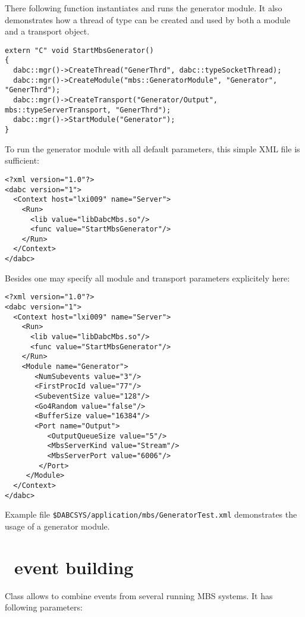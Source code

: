 There following function  instantiates and runs 
the generator module.
It also demonstrates how a thread of type  can be created
and used by both a module and a transport object. 
\begin{small}
\begin{verbatim}
extern "C" void StartMbsGenerator()
{
  dabc::mgr()->CreateThread("GenerThrd", dabc::typeSocketThread);
  dabc::mgr()->CreateModule("mbs::GeneratorModule", "Generator", "GenerThrd");
  dabc::mgr()->CreateTransport("Generator/Output", mbs::typeServerTransport, "GenerThrd");
  dabc::mgr()->StartModule("Generator");
}
\end{verbatim}
\end{small}

To run the generator module with all default parameters, 
this simple XML file is sufficient:   
\begin{small}
\begin{verbatim}
<?xml version="1.0"?>
<dabc version="1">
  <Context host="lxi009" name="Server">
    <Run>
      <lib value="libDabcMbs.so"/>
      <func value="StartMbsGenerator"/>
    </Run>
  </Context>
</dabc>
\end{verbatim}
\end{small}

Besides one may specify all module and transport parameters explicitely here:
\begin{small}
\begin{verbatim}
<?xml version="1.0"?>
<dabc version="1">
  <Context host="lxi009" name="Server">
    <Run>
      <lib value="libDabcMbs.so"/>
      <func value="StartMbsGenerator"/>
    </Run>
    <Module name="Generator">
       <NumSubevents value="3"/>
       <FirstProcId value="77"/>
       <SubeventSize value="128"/>
       <Go4Random value="false"/>
       <BufferSize value="16384"/>
       <Port name="Output">
          <OutputQueueSize value="5"/>
          <MbsServerKind value="Stream"/>
          <MbsServerPort value="6006"/>
        </Port>
     </Module>
  </Context>
</dabc>
\end{verbatim}
\end{small}

Example file {\tt \$DABCSYS/application/mbs/GeneratorTest.xml}  
demonstrates the usage of a generator module. 


\section[MBS event building]{\mbs\ event building}
Class  allows to combine events from
several running MBS systems. It has following parameters:

